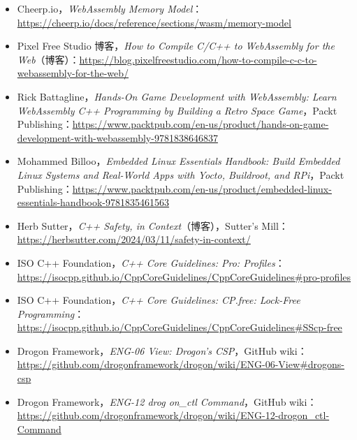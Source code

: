 \begin{itemize}
\item Cheerp.io，\emph{WebAssembly Memory Model}：\href{https://cheerp.io/docs/reference/sections/wasm/memory-model}{https://cheerp.io/docs/reference/sections/wasm/memory-model}
\item Pixel Free Studio 博客，\emph{How to Compile C/C++ to WebAssembly for the Web}（博客）：\href{https://blog.pixelfreestudio.com/how-to-compile-c-c-to-webassembly-for-the-web/ }{https://blog.pixelfreestudio.com/how-to-compile-c-c-to-webassembly-for-the-web/}
\item Rick Battagline，\emph{Hands-On Game Development with WebAssembly: Learn WebAssembly C++ Programming by Building a Retro Space Game}，Packt Publishing：\href{https://www.packtpub.com/en-us/product/hands-on-game-development-with-webassembly-9781838646837}{https://www.packtpub.com/en-us/product/hands-on-game-development-with-webassembly-9781838646837}
\item Mohammed Billoo，\emph{Embedded Linux Essentials Handbook: Build Embedded Linux Systems and Real-World Apps with Yocto, Buildroot, and RPi}，Packt Publishing：\href{https://www.packtpub.com/en-us/product/embedded-linux-essentials-handbook-9781835461563}{https://www.packtpub.com/en-us/product/embedded-linux-essentials-handbook-9781835461563}
\item Herb Sutter，\emph{C++ Safety, in Context}（博客），Sutter’s Mill：\href{https://herbsutter.com/2024/03/11/safety-in-context/ }{https://herbsutter.com/2024/03/11/safety-in-context/}
\item ISO C++ Foundation，\emph{C++ Core Guidelines: Pro: Profiles}：\href{https://isocpp.github.io/CppCoreGuidelines/CppCoreGuidelines\#pro-profiles }{https://isocpp.github.io/CppCoreGuidelines/CppCoreGuidelines\#pro-profiles}
\item ISO C++ Foundation，\emph{C++ Core Guidelines: CP.free: Lock-Free Programming}：\href{https://isocpp.github.io/CppCoreGuidelines/CppCoreGuidelines\#SScp-free }{https://isocpp.github.io/CppCoreGuidelines/CppCoreGuidelines\#SScp-free}
\item Drogon Framework，\emph{ENG-06 View: Drogon’s CSP}，GitHub wiki：\href{https://github.com/drogonframework/drogon/wiki/ENG-06-View\#drogons-csp }{https://github.com/drogonframework/drogon/wiki/ENG-06-View\#drogons-csp}
\item Drogon Framework，\emph{ENG-12 drog on\_ctl Command}，GitHub wiki：\href{https://github.com/drogonframework/drogon/wiki/ENG-12-drogon_ctl-Command}{https://github.com/drogonframework/drogon/wiki/ENG-12-drogon\_ctl-Command}

\end{itemize}
